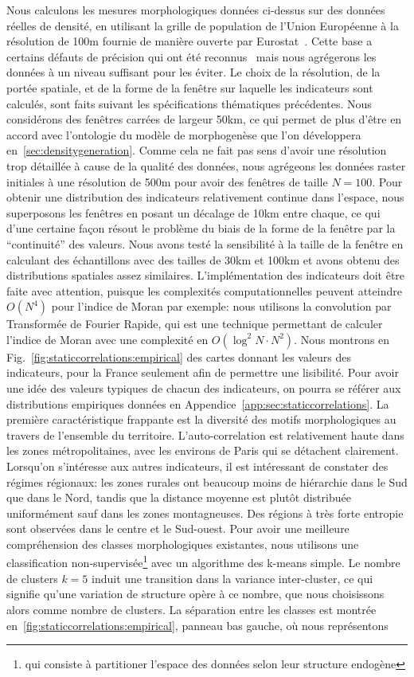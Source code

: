 {}{
Nous calculons les mesures morphologiques données ci-dessus sur des données réelles de densité, en utilisant la grille de population de l'Union Européenne à la résolution de 100m fournie de manière ouverte par Eurostat~\cite{eurostat}. Cette base a certains défauts de précision qui ont été reconnus~\cite{bretagnolle2016ville} mais nous agrégerons les données à un niveau suffisant pour les éviter. Le choix de la résolution, de la portée spatiale, et de la forme de la fenêtre sur laquelle les indicateurs sont calculés, sont faits suivant les spécifications thématiques précédentes. Nous considérons des fenêtres carrées de largeur 50km, ce qui permet de plus d'être en accord avec l'ontologie du modèle de morphogenèse que l'on développera en~\ref{sec:densitygeneration}. Comme cela ne fait pas sens d'avoir une résolution trop détaillée à cause de la qualité des données, nous agrégeons les données raster initiales à une résolution de 500m pour avoir des fenêtres de taille $N=100$. Pour obtenir une distribution des indicateurs relativement continue dans l'espace, nous superposons les fenêtres en posant un décalage de 10km entre chaque, ce qui d'une certaine façon résout le problème du biais de la forme de la fenêtre par la ``continuité'' des valeurs. Nous avons testé la sensibilité à la taille de la fenêtre en calculant des échantillons avec des tailles de 30km et 100km et avons obtenu des distributions spatiales assez similaires. L'implémentation des indicateurs doit être faite avec attention, puisque les complexités computationnelles peuvent atteindre $O(N^4)$ pour l'indice de Moran par exemple: nous utilisons la convolution par Transformée de Fourier Rapide, qui est une technique permettant de calculer l'indice de Moran avec une complexité en $O(\log^2 N \cdot N^2)$. Nous montrons en Fig.~\ref{fig:staticcorrelations:empirical} des cartes donnant les valeurs des indicateurs, pour la France seulement afin de permettre une lisibilité. Pour avoir une idée des valeurs typiques de chacun des indicateurs, on pourra se référer aux distributions empiriques données en Appendice~\ref{app:sec:staticcorrelations}. La première caractéristique frappante est la diversité des motifs morphologiques au travers de l'ensemble du territoire. L'auto-correlation est relativement haute dans les zones métropolitaines, avec les environs de Paris qui se détachent clairement. Lorsqu'on s'intéresse aux autres indicateurs, il est intéressant de constater des régimes régionaux: les zones rurales ont beaucoup moins de hiérarchie dans le Sud que dans le Nord, tandis que la distance moyenne est plutôt distribuée uniformément sauf dans les zones montagneuses. Des régions à très forte entropie sont observées dans le centre et le Sud-ouest. Pour avoir une meilleure compréhension des classes morphologiques existantes, nous utilisons une classification non-supervisée\footnote{qui consiste à partitioner l'espace des données selon leur structure endogène} avec un algorithme des k-means simple. Le nombre de clusters $k=5$ induit une transition dans la variance inter-cluster, ce qui signifie qu'une variation de structure opère à ce nombre, que nous choisissons alors comme nombre de clusters. La séparation entre les classes est montrée en~\ref{fig:staticcorrelations:empirical}, panneau bas gauche, où nous représentons }
